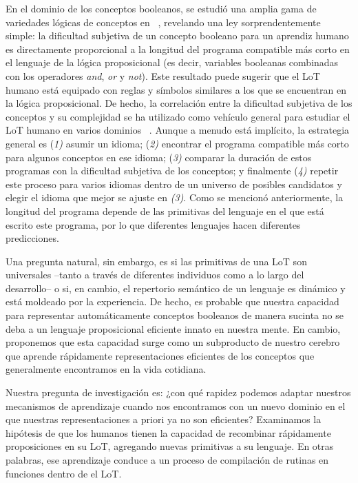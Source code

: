 En el dominio de los conceptos booleanos, se estudió una amplia gama de variedades lógicas de conceptos en ~\cite{feldman2003simplicity}, revelando una ley sorprendentemente simple: la dificultad subjetiva de un concepto booleano para un aprendiz humano es directamente proporcional a la longitud del programa compatible más corto en el lenguaje de la lógica proposicional (es decir, variables booleanas combinadas con los operadores \textit{and}, \textit {or} y \textit{not}). Este resultado puede sugerir que el LoT humano está equipado con reglas y símbolos similares a los que se encuentran en la lógica proposicional. De hecho, la correlación entre la dificultad subjetiva de los conceptos y su complejidad se ha utilizado como vehículo general para estudiar el LoT humano en varios dominios ~\cite{piantadosi2016logical, leeuwenberg1971perceptual, amalric2017language, romano2018, lupyan2007language}. Aunque a menudo está implícito, la estrategia general es (\textit{1)} asumir un idioma; (\textit{2)} encontrar el programa compatible más corto para algunos conceptos en ese idioma; (\textit{3)} comparar la duración de estos programas con la dificultad subjetiva de los conceptos; y finalmente (\textit{4)} repetir este proceso para varios idiomas dentro de un universo de posibles candidatos y elegir el idioma que mejor se ajuste en \textit{(3)}. Como se mencionó anteriormente, la longitud del programa depende de las primitivas del lenguaje en el que está escrito este programa, por lo que diferentes lenguajes hacen diferentes predicciones.

Una pregunta natural, sin embargo, es si las primitivas de una LoT son universales --tanto a través de diferentes individuos como a lo largo del desarrollo-- o si, en cambio, el repertorio semántico de un lenguaje es dinámico y está moldeado por la experiencia. De hecho, es probable que nuestra capacidad para representar automáticamente conceptos booleanos de manera sucinta no se deba a un lenguaje proposicional eficiente innato en nuestra mente. En cambio, proponemos que esta capacidad surge como un subproducto de nuestro cerebro que aprende rápidamente representaciones eficientes de los conceptos que generalmente encontramos en la vida cotidiana. 

Nuestra pregunta de investigación es: ¿con qué rapidez podemos adaptar nuestros mecanismos de aprendizaje cuando nos encontramos con un nuevo dominio en el que nuestras representaciones a priori ya no son eficientes? Examinamos la hipótesis de que los humanos tienen la capacidad de recombinar rápidamente proposiciones en su LoT, agregando nuevas primitivas a su lenguaje. En otras palabras, ese aprendizaje conduce a un proceso de compilación de rutinas en funciones dentro de el LoT.

